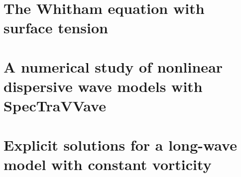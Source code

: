\section{The Whitham equation with surface tension}






\section{A numerical study of nonlinear dispersive wave models with SpecTraVVave}





\section{Explicit solutions for a long-wave model with constant vorticity}
